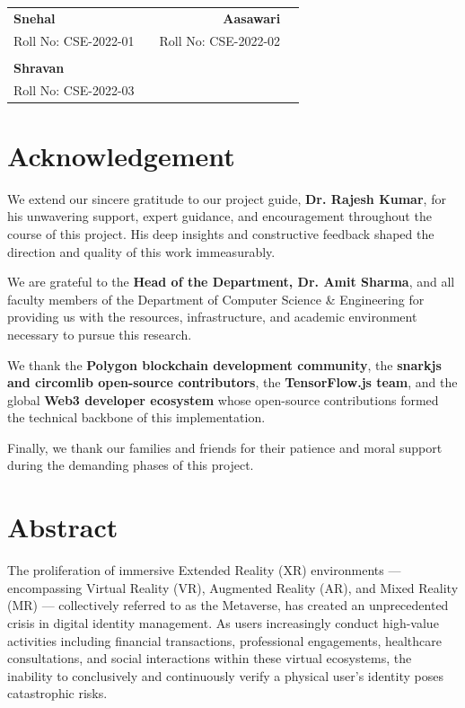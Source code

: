 \documentclass[12pt,a4paper,oneside]{report}
\begin{document}
\vspace{3cm}
\noindent
\begin{tabular}{lcrc}
    \textbf{Snehal} & \hspace{4cm} & \textbf{Aasawari} \\
    Roll No: CSE-2022-01 & & Roll No: CSE-2022-02 \\
    \\
    \textbf{Shravan} & & \\
    Roll No: CSE-2022-03 & & \\
\end{tabular}

\newpage

\chapter*{Acknowledgement}
We extend our sincere gratitude to our project guide, \textbf{Dr. Rajesh Kumar}, for his unwavering support, expert guidance, and encouragement throughout the course of this project. His deep insights and constructive feedback shaped the direction and quality of this work immeasurably.

We are grateful to the \textbf{Head of the Department, Dr. Amit Sharma}, and all faculty members of the Department of Computer Science \& Engineering for providing us with the resources, infrastructure, and academic environment necessary to pursue this research.

We thank the \textbf{Polygon blockchain development community}, the \textbf{snarkjs and circomlib open-source contributors}, the \textbf{TensorFlow.js team}, and the global \textbf{Web3 developer ecosystem} whose open-source contributions formed the technical backbone of this implementation.

Finally, we thank our families and friends for their patience and moral support during the demanding phases of this project.

\newpage

\chapter*{Abstract}
The proliferation of immersive Extended Reality (XR) environments --- encompassing Virtual Reality (VR), Augmented Reality (AR), and Mixed Reality (MR) --- collectively referred to as the Metaverse, has created an unprecedented crisis in digital identity management. As users increasingly conduct high-value activities including financial transactions, professional engagements, healthcare consultations, and social interactions within these virtual ecosystems, the inability to conclusively and continuously verify a physical user's identity poses catastrophic risks.
\end{document}
